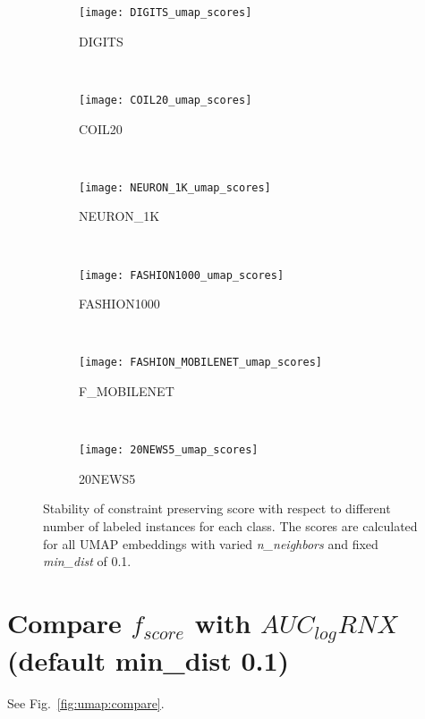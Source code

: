 \begin{figure*}[pos=h]
    \centering
    \begin{subfigure}[b]{0.152\textwidth}
        \centering
        \texttt{[image: DIGITS\_umap\_scores]}
        \caption{DIGITS}
    \end{subfigure}
    ~
    \begin{subfigure}[b]{0.152\textwidth}
        \texttt{[image: COIL20\_umap\_scores]}
        \caption{COIL20}
    \end{subfigure}
    ~
    \begin{subfigure}[b]{0.152\textwidth}
        \texttt{[image: NEURON\_1K\_umap\_scores]}
        \caption{NEURON\_1K}
    \end{subfigure}
    ~
    \begin{subfigure}[b]{0.152\textwidth}
        \centering
        \texttt{[image: FASHION1000\_umap\_scores]}
        \caption{FASHION1000}
    \end{subfigure}
    ~
    \begin{subfigure}[b]{0.152\textwidth}
        \texttt{[image: FASHION\_MOBILENET\_umap\_scores]}
        \caption{F\_MOBILENET}
    \end{subfigure}
    ~
    \begin{subfigure}[b]{0.152\textwidth}
        \texttt{[image: 20NEWS5\_umap\_scores]}
        \caption{20NEWS5}
    \end{subfigure}
    \caption{Stability of constraint preserving score with respect to different number of labeled instances for each class. The scores are calculated for all UMAP embeddings with varied \emph{n\_neighbors} and fixed \emph{min\_dist} of 0.1.}
    \label{fig:score:umap:stability:annex}
\end{figure*}


\section{Compare $f_{score}$ with $AUC_{log}RNX$ (default min\_dist 0.1)}
See Fig.~\ref{fig:umap:compare}.

